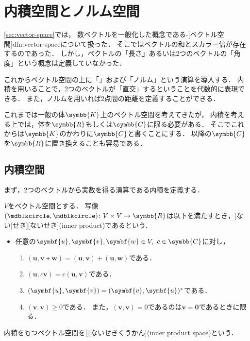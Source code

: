 \documentclass[../sotsu.tex]{subfiles}
\begin{document}
\section{内積空間とノルム空間}
\label{sec:inner-product-space}

\cref{sec:vector-space}では，
数ベクトルを一般化した概念である-[ベクトル空間]{dfn:vector-space}について扱った．
そこではベクトルの和とスカラー倍が存在するのであった．
しかし，ベクトルの「長さ」あるいは2つのベクトルの「角度」という概念は定義していなかった．

これからベクトル空間の上に「」および「ノルム」という演算を導入する．
内積を用いることで，2つのベクトルが「直交」するということを代数的に表現できる．
また，ノルムを用いれば2点間の距離を定義することができる．

これまでは一般の体$\symbb{K}$上のベクトル空間を考えてきたが，
内積を考える上では，体を$\symbb{R}$もしくは$\symbb{C}$に限る必要がある．
そこでこれからは$\symbb{K}$のかわりに$\symbb{C}$と書くことにする．
以降の$\symbb{C}$を$\symbb{R}$に置き換えることも容易である．


\subsection{内積空間}
\label{sec:inner-product-space}

まず，2つのベクトルから実数を得る演算である内積を定義する．

\begin{definition}[内積]
    \label{dfn:inner-product}
    $V$をベクトル空間とする．
    写像$({\bigdot}, {\bigdot}) \colon V \times V \to \symbb{R}$は以下を満たすとき，[ない|せき][ないせき](inner product)であるという．
    \begin{itemize}
        \item 任意の$\symbf{u}, \symbf{v}, \symbf{w} \in V, \  c \in \symbb{C}$に対し，
        \begin{enumerate}
            \item \label{innerp:sum} $(\symbf{u}, \symbf{v} \tplus \symbf{w}) = (\symbf{u}, \symbf{v}) + (\symbf{u}, \symbf{w})$である．
            \item \label{innerp:scalar} $(\symbf{u}, c\symbf{v}) = c(\symbf{u}, \symbf{v})$である．
            \item \label{innerp:conjugate-symmetry} $(\symbf{u}, \symbf{v}) = \conj{(\symbf{v}, \symbf{u})}$である．
            \item \label{innerp:positive-definiteness}$(\symbf{v}, \symbf{v}) \geq 0$である．
                また，$(\symbf{v}, \symbf{v}) = 0$であるのは$\symbf{v} = \symbf{0}$であるときに限る．
        \end{enumerate}
    \end{itemize}
    内積をもつベクトル空間を[][ないせきくうかん](inner product space)という．
\end{definition}
\end{document}
